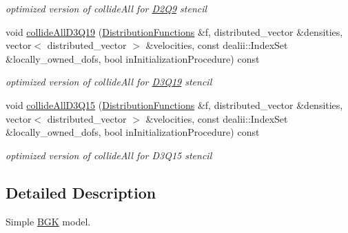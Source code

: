 \begin{DoxyCompactItemize}
\begin{DoxyCompactList}\small\item\em optimized version of collideAll for \hyperlink{classnatrium_1_1D2Q9}{D2Q9} stencil \item\end{DoxyCompactList}\item 
\hypertarget{classnatrium_1_1BGKStandard_a7362ff8603390301e8c4062ad348edd1}{
void \hyperlink{classnatrium_1_1BGKStandard_a7362ff8603390301e8c4062ad348edd1}{collideAllD3Q19} (\hyperlink{classnatrium_1_1DistributionFunctions}{DistributionFunctions} \&f, distributed\_\-vector \&densities, vector$<$ distributed\_\-vector $>$ \&velocities, const dealii::IndexSet \&locally\_\-owned\_\-dofs, bool inInitializationProcedure) const }
\label{classnatrium_1_1BGKStandard_a7362ff8603390301e8c4062ad348edd1}

\begin{DoxyCompactList}\small\item\em optimized version of collideAll for \hyperlink{classnatrium_1_1D3Q19}{D3Q19} stencil \item\end{DoxyCompactList}\item 
\hypertarget{classnatrium_1_1BGKStandard_a6ffd7d81aef7a233dd44c46eb539e833}{
void \hyperlink{classnatrium_1_1BGKStandard_a6ffd7d81aef7a233dd44c46eb539e833}{collideAllD3Q15} (\hyperlink{classnatrium_1_1DistributionFunctions}{DistributionFunctions} \&f, distributed\_\-vector \&densities, vector$<$ distributed\_\-vector $>$ \&velocities, const dealii::IndexSet \&locally\_\-owned\_\-dofs, bool inInitializationProcedure) const }
\label{classnatrium_1_1BGKStandard_a6ffd7d81aef7a233dd44c46eb539e833}

\begin{DoxyCompactList}\small\item\em optimized version of collideAll for D3Q15 stencil \item\end{DoxyCompactList}\end{DoxyCompactItemize}


\subsection{Detailed Description}
Simple \hyperlink{classnatrium_1_1BGK}{BGK} model. 

